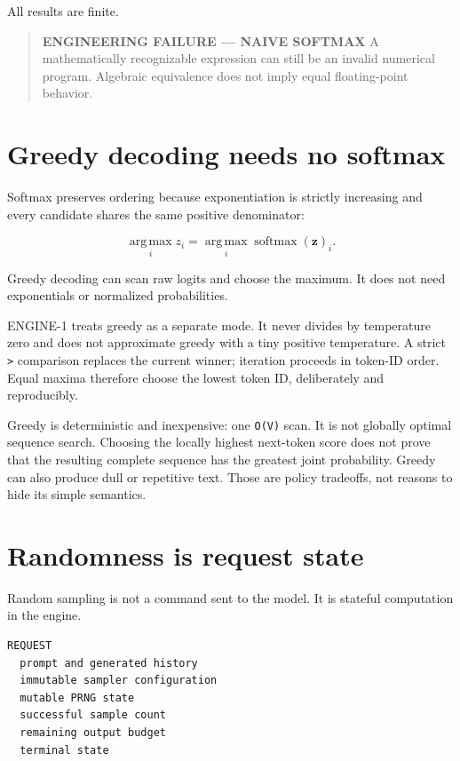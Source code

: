 All results are finite.

\begin{quote}
\textbf{ENGINEERING FAILURE --- NAIVE SOFTMAX} A mathematically
recognizable expression can still be an invalid numerical program.
Algebraic equivalence does not imply equal floating-point behavior.
\end{quote}

\section{Greedy decoding needs no
softmax}\label{greedy-decoding-needs-no-softmax}

Softmax preserves ordering because exponentiation is strictly increasing
and every candidate shares the same positive denominator:

\begin{equation}
\operatorname*{arg\,max}_i z_i
=\operatorname*{arg\,max}_i \operatorname{softmax}(\mathbf{z})_i.
\end{equation}

Greedy decoding can scan raw logits and choose the maximum. It does not
need exponentials or normalized probabilities.

ENGINE-1 treats greedy as a separate
\texttt{} mode. It never divides by
temperature zero and does not approximate greedy with a tiny positive
temperature. A strict \texttt{\textgreater{}} comparison replaces the
current winner; iteration proceeds in token-ID order. Equal maxima
therefore choose the lowest token ID, deliberately and reproducibly.

Greedy is deterministic and inexpensive: one \texttt{O(V)} scan. It is
not globally optimal sequence search. Choosing the locally highest
next-token score does not prove that the resulting complete sequence has
the greatest joint probability. Greedy can also produce dull or
repetitive text. Those are policy tradeoffs, not reasons to hide its
simple semantics.

\section{Randomness is request
state}\label{randomness-is-request-state}

Random sampling is not a command sent to the model. It is stateful
computation in the engine.

\begin{verbatim}
REQUEST
  prompt and generated history
  immutable sampler configuration
  mutable PRNG state
  successful sample count
  remaining output budget
  terminal state
\end{verbatim}

